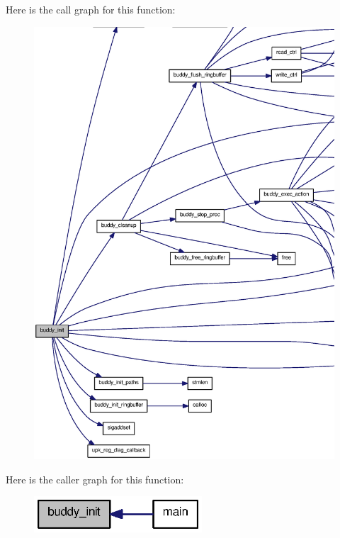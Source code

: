 Here is the call graph for this function:
\nopagebreak
\begin{figure}[H]
\begin{center}
\leavevmode
\includegraphics[width=400pt]{buddy_8h_a8243634d0b4e7fe2b2ece3c97bbbd060_cgraph}
\end{center}
\end{figure}




Here is the caller graph for this function:\nopagebreak
\begin{figure}[H]
\begin{center}
\leavevmode
\includegraphics[width=178pt]{buddy_8h_a8243634d0b4e7fe2b2ece3c97bbbd060_icgraph}
\end{center}
\end{figure}



